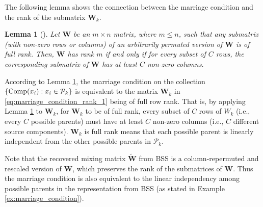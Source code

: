 \documentclass[12pt]{article}
\newtheorem{lemma}{Lemma}
\newcommand{\bB}{\mathbf{B}}
\newcommand{\bW}{\mathbf{W}}
\begin{document}

The following lemma shows the connection between the marriage condition and the rank of the submatrix $\bW_k$.
\begin{lemma} [\citet{edmonds1967systems}] \label{prop:marriage_condition_rank}
Let $\bW$ be an $m\times n$ matrix, where $m\leq n$, such that any submatrix (with non-zero rows or columns) of an arbitrarily permuted version of $\bW$ is of full rank. 
Then, $\bW$ has rank $m$ if and only if for every subset of $C$ rows, the corresponding submatrix of $\bW$ has at least $C$ non-zero columns. 
\end{lemma}
According to Lemma \ref{prop:marriage_condition_rank}, the marriage condition on the collection $\{{\rm{Comp}}(x_i):x_i\in \mathcal{P}_k\}$ is equivalent to the matrix $\bW_k$ in \eqref{eq:marriage_condition_rank_1} being of full row rank. That is, by applying Lemma \ref{prop:marriage_condition_rank} to $\bW_k$, for $\bW_k$ to be of full rank, every subset of $C$ rows of $W_k$ (i.e., every $C$ possible parents) must have at least $C$ non-zero columns (i.e., $C$ different source components). $\bW_k$ is full rank means that each possible parent is linearly independent from the other possible parents in $\mathcal{P}_k$. 

Note that the recovered mixing matrix $\tilde{\bW}$ from BSS is a column-repermuted and rescaled version of $\bW$, which preserves the rank of the submatrices of $\bW$. Thus the marriage condition is also equivalent to the linear independency among possible parents in the representation from BSS (as stated in Example \ref{ex:marriage_condition}). 
\end{document}

